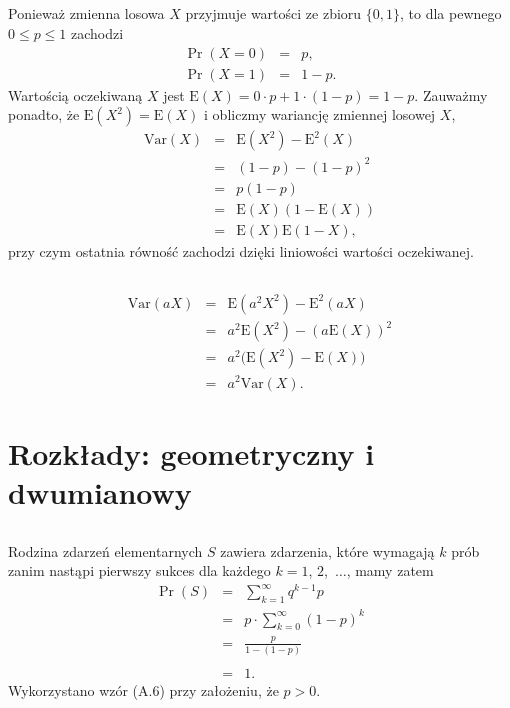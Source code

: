 \subsection{} %
Ponieważ zmienna losowa $X$ przyjmuje wartości ze zbioru $\{0,1\}$, to dla pewnego $0\le p\le1$ zachodzi
\begin{eqnarray*}
	\Pr(X=0) &=& p, \\
	\Pr(X=1) &=& 1-p.
\end{eqnarray*}
Wartością oczekiwaną $X$ jest $\mathrm{E}(X)=0\cdot p+1\cdot(1-p)=1-p$. Zauważmy ponadto, że $\mathrm{E}(X^2)=\mathrm{E}(X)$ i obliczmy wariancję zmiennej losowej $X$,
\begin{eqnarray*}
	\mathrm{Var}(X) &=& \mathrm{E}(X^2)-\mathrm{E}^2(X) \\
	&=& (1-p)-(1-p)^2 \\
	&=& p(1-p) \\
	&=& \mathrm{E}(X)(1-\mathrm{E}(X)) \\
	&=& \mathrm{E}(X)\mathrm{E}(1-X),
\end{eqnarray*}
przy czym ostatnia równość zachodzi dzięki liniowości wartości oczekiwanej.

\subsection{} %
\begin{eqnarray*}
	\mathrm{Var}(aX) &=& \mathrm{E}(a^2X^2)-\mathrm{E}^2(aX) \\
	&=& a^2\mathrm{E}(X^2)-(a\mathrm{E}(X))^2 \\
	&=& a^2\bigl(\mathrm{E}(X^2)-\mathrm{E}(X)\bigr) \\
	&=& a^2\mathrm{Var}(X).
\end{eqnarray*}

\section{Rozkłady: geometryczny i dwumianowy}
\subsection{} %
Rodzina zdarzeń elementarnych $S$ zawiera zdarzenia, które wymagają $k$ prób zanim nastąpi pierwszy sukces dla każdego $k=1$, $2$,~$\dots$, mamy zatem
\begin{eqnarray*}
	\Pr(S) &=& \sum_{k=1}^\infty q^{k-1}p \\
	&=& p\cdot\sum_{k=0}^\infty (1-p)^k \\
	&=& \frac{p}{1-(1-p)} \\\\
	&=& 1.
\end{eqnarray*}
Wykorzystano wzór (A.6) przy założeniu, że $p>0$.

